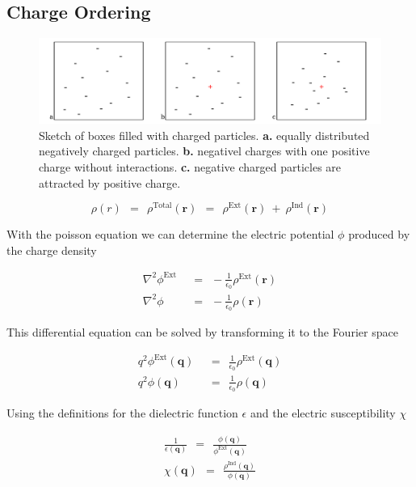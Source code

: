 \documentclass[10pt]{report}
\numberwithin{equation}{chapter}
\begin{document}
\subsection{Charge Ordering}

\begin{figure}
  \centering
  \includegraphics[width=1.0\textwidth]{../img/screening_charge_box.pdf}
  \caption{Sketch of boxes filled with charged particles. \textbf{a.} equally distributed negatively charged particles. \textbf{b.} negativel charges with one positive charge without interactions. \textbf{c.} negative charged particles are attracted by positive charge.}
  \label{fig:screening_charge_box}
\end{figure}

\begin{equation} \label{eq:tot_charge_dens}
  \rho(r) ~~=~~ \rho^\text{Total}(\mathbf{r}) ~~=~~ \rho^\text{Ext}(\mathbf{r}) ~+~ \rho^\text{Ind}(\mathbf{r})
\end{equation}


With the poisson equation we can determine the electric potential $\phi$ produced by the charge density

\begin{align}
  \nabla^2 \phi^\text{Ext} ~~& =~~ -\frac{1}{\epsilon_0} \rho^\text{Ext}(\mathbf{r}) \\
  \nabla^2 \phi	~~& =~~ -\frac{1}{\epsilon_0} \rho(\mathbf{r})
\end{align}


This differential equation can be solved by transforming it to the Fourier space

\begin{align}
  q^2 \phi^\text{Ext}(\mathbf{q}) ~~& =~~ \frac{1}{\epsilon_0} \rho^\text{Ext}(\mathbf{q}) \\
  q^2 \phi (\mathbf{q}) ~~&=~~ \frac{1}{\epsilon_0}  \rho(\mathbf{q})
\end{align}


Using the definitions for the dielectric function $\epsilon$ and the electric susceptibility $\chi$

\begin{align}  \label{eq:screen_dielect}
  \frac{1}{\epsilon(\mathbf{q})} ~~=~~ \frac{\phi(\mathbf{q})}{\phi^\text{Ext}(\mathbf{q})} \\
  \label{eq:screen_suscept}
  \chi(\mathbf{q}) ~~=~~ \frac{\rho^\text{Ind}(\mathbf{q})}{\phi(\mathbf{q})}
\end{align}
\end{document}
